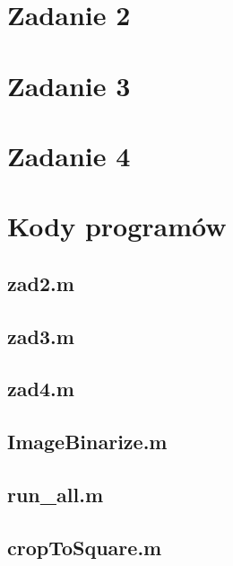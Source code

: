 





 



\section*{Zadanie 2}



\section*{Zadanie 3}



\section*{Zadanie 4}



\newpage \section*{Kody programów}

\subsection*{zad2.m              } \newpage
\subsection*{zad3.m              } \newpage
\subsection*{zad4.m              } \newpage
\subsection*{ImageBinarize.m     } \newpage
\subsection*{run\_all.m           }
\subsection*{cropToSquare.m      }






